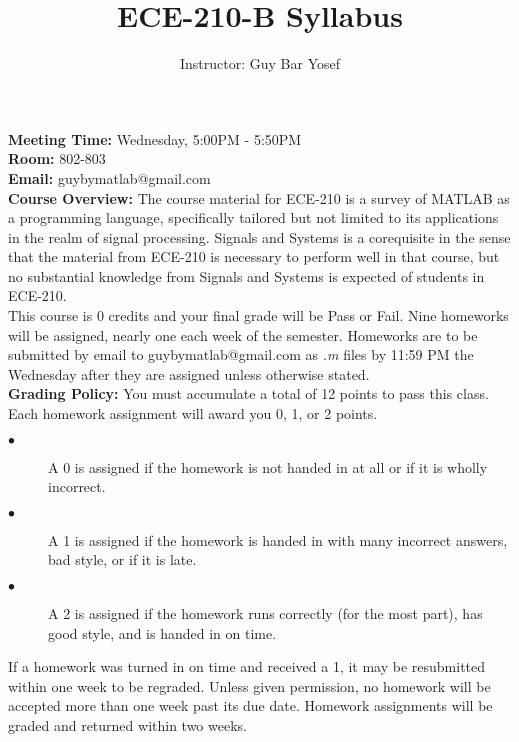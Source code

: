 \documentclass[12pt]{article}
\begin{document}

\title{ECE-210-B Syllabus}
\date{}
\author{Instructor: Guy Bar Yosef}
\maketitle

\textbf{Meeting Time:} Wednesday, 5:00PM - 5:50PM \\
\textbf{Room:} 802-803 \\
\textbf{Email:} guybymatlab@gmail.com \\

\textbf{Course Overview:}
The course material for ECE-210 is a survey of 
MATLAB as a programming language, specifically tailored but not 
limited to its applications in the realm of signal processing. 
Signals and Systems is a corequisite in the sense that the material 
from ECE-210 is necessary to perform well in that course, but no substantial 
knowledge from Signals and Systems is expected of students in ECE-210.\\

This course is 0 credits and your final grade will be Pass or Fail. 
Nine homeworks will be assigned, nearly one each week of the semester. 
Homeworks are to be submitted by email to guybymatlab@gmail.com as \textit{.m} 
files by 11:59 PM the Wednesday after they are assigned unless otherwise stated.\\

\textbf{Grading Policy:}
You must accumulate a total of 12 points to pass this class.
Each homework assignment will award you 0, 1, or 2 points.
\begin{description}
    \item [$\bullet$]A 0 is assigned if the homework is not handed 
    in at all or if it is wholly incorrect.
    \item [$\bullet$]A 1 is assigned if the homework is handed
    in with many incorrect answers, bad style, or if it is late.
    \item [$\bullet$]A 2 is assigned if the homework runs correctly
    (for the most part), has good style, and is handed in on time.
\end{description} 
If a homework was turned in on time and received a 1,
it may be resubmitted within one week to be regraded.
Unless given permission, no homework will be accepted more than one 
week past its due date. Homework assignments will be graded and 
returned within two weeks. \\
\end{document}
